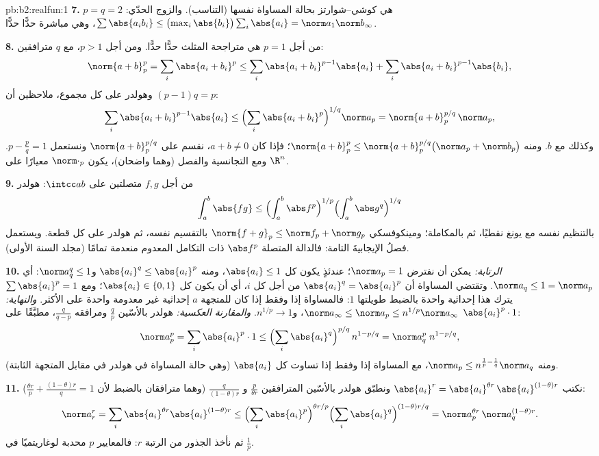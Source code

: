 \begin{solution}{pb:b2:realfun:1}
\textbf{7.} $p = q = 2$ هي كوشي--شوارتز بحالة المساواة
نفسها (التناسب). والزوج الحدّي: $\sum\abs{a_ib_i}
\leq \bigl(\max_i\abs{b_i}\bigr)\sum_i\abs{a_i} =
\norm a_1\norm b_\infty$، وهي مباشرة حدًّا حدًّا.

\textbf{8.} من أجل $p = 1$ هي متراجحة المثلث حدًّا حدًّا.
ومن أجل $p > 1$، مع $q$ مترافقين:
\[
\norm{a+b}_p^p = \sum_i\abs{a_i + b_i}^p
\leq \sum_i\abs{a_i+b_i}^{p-1}\abs{a_i} +
\sum_i\abs{a_i+b_i}^{p-1}\abs{b_i},
\]
وهولدر على كل مجموع، ملاحظين أن $(p - 1)q = p$:
\[
\sum_i\abs{a_i+b_i}^{p-1}\abs{a_i} \leq
\Bigl(\sum_i\abs{a_i+b_i}^{p}\Bigr)^{1/q}\norm a_p
= \norm{a + b}_p^{p/q}\,\norm a_p ,
\]
وكذلك مع $b$. ومنه $\norm{a+b}_p^p \leq \norm{a +
b}_p^{p/q}\bigl(\norm a_p + \norm b_p\bigr)$؛ فإذا كان $a + b \neq 0$،
نقسم على $\norm{a+b}_p^{p/q}$ ونستعمل $p - \frac pq = 1$. ومع
التجانسية والفصل (وهما واضحان)، يكون $\norm\cdot_p$ معيارًا على
$\R^n$.

\textbf{9.} من أجل $f, g$ متصلتين على $\intcc ab$: هولدر
\[
\int_a^b\abs{fg} \leq \Bigl(\int_a^b\abs
f^p\Bigr)^{1/p}\Bigl(\int_a^b\abs g^q\Bigr)^{1/q}
\]
بالتنظيم نفسه مع يونغ نقطيًا، ثم بالمكاملة؛ ومينكوفسكي $\norm{f + g}_p \leq \norm f_p + \norm g_p$ بالتقسيم
نفسه، ثم هولدر على كل قطعة. ويستعمل فصلُ 
الإيجابيةَ التامة: فالدالة المتصلة $\abs f^p$ ذات التكامل
المعدوم منعدمة تمامًا (مجلد السنة الأولى).

\textbf{10.} \emph{الرتابة:} يمكن أن نفترض $\norm a_p = 1$؛
عندئذٍ يكون كل $\abs{a_i} \leq 1$، ومنه $\abs{a_i}^q \leq \abs{a_i}^p$
و$\norm a_q^q \leq 1$: أي $\norm a_q \leq 1 = \norm a_p$.
وتقتضي المساواة أن $\abs{a_i}^q = \abs{a_i}^p$ من أجل كل $i$،
أي أن يكون كل $\abs{a_i} \in \{0, 1\}$؛ ومع $\sum\abs{a_i}^p = 1$
يترك هذا إحداثية واحدة بالضبط طويلتها $1$: فالمساواة إذا وفقط إذا كان
للمتجهة $a$ إحداثية غير معدومة واحدة على الأكثر. \emph{والنهاية:} $\norm a_\infty \leq
\norm a_p \leq n^{1/p}\norm a_\infty$، و$n^{1/p} \to 1$.
\emph{والمقارنة العكسية:} هولدر بالأسّين $\frac
qp$ ومرافقه $\frac{q}{q-p}$، مطبَّقًا على
$\abs{a_i}^p\cdot 1$:
\[
\norm a_p^p = \sum_i\abs{a_i}^p\cdot 1 \leq
\Bigl(\sum_i\abs{a_i}^{q}\Bigr)^{p/q}\,n^{1 - p/q}
= \norm a_q^{p}\; n^{1-p/q},
\]
ومنه $\norm a_p \leq n^{\frac1p - \frac1q}\norm a_q$، مع
المساواة إذا وفقط إذا تساوت كل $\abs{a_i}$ (وهي حالة المساواة في هولدر
في مقابل المتجهة الثابتة).

\textbf{11.} نكتب $\abs{a_i}^r = \abs{a_i}^{\theta
r}\,\abs{a_i}^{(1-\theta)r}$ ونطبّق هولدر بالأسّين
المترافقين $\frac{p}{\theta r}$ و
$\frac{q}{(1-\theta)r}$ (وهما مترافقان بالضبط لأن $\frac{\theta
r}p + \frac{(1-\theta)r}q = 1$):
\[
\norm a_r^r = \sum_i \abs{a_i}^{\theta r}\abs{a_i}^{(1-\theta)r}
\leq \Bigl(\sum_i\abs{a_i}^{p}\Bigr)^{\theta r/p}
\Bigl(\sum_i\abs{a_i}^{q}\Bigr)^{(1-\theta)r/q}
= \norm a_p^{\theta r}\,\norm a_q^{(1-\theta)r} .
\]
ثم نأخذ الجذور من الرتبة $r$: فالمعايير $p$ محدبة لوغاريتميًا في $\frac1p$.


\end{solution}
